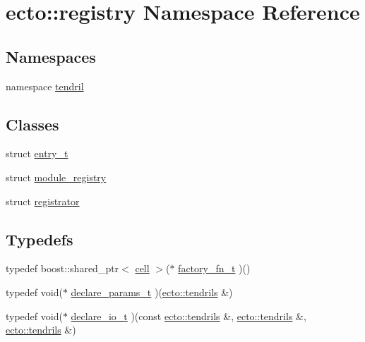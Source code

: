 \hypertarget{namespaceecto_1_1registry}{\section{ecto\-:\-:registry \-Namespace \-Reference}
\label{namespaceecto_1_1registry}
}
\subsection*{\-Namespaces}
\begin{DoxyCompactItemize}
\item 
namespace \hyperlink{namespaceecto_1_1registry_1_1tendril}{tendril}
\end{DoxyCompactItemize}
\subsection*{\-Classes}
\begin{DoxyCompactItemize}
\item 
struct \hyperlink{structecto_1_1registry_1_1entry__t}{entry\-\_\-t}
\item 
struct \hyperlink{structecto_1_1registry_1_1module__registry}{module\-\_\-registry}
\item 
struct \hyperlink{structecto_1_1registry_1_1registrator}{registrator}
\end{DoxyCompactItemize}
\subsection*{\-Typedefs}
\begin{DoxyCompactItemize}
\item 
typedef boost\-::shared\-\_\-ptr$<$ \hyperlink{structecto_1_1cell}{cell} $>$($\ast$ \hyperlink{namespaceecto_1_1registry_a3f75a16f135bcadb9bf1a7000b807b3b}{factory\-\_\-fn\-\_\-t} )()
\item 
typedef void($\ast$ \hyperlink{namespaceecto_1_1registry_a04d849b45313a8ce9a602095e1edade9}{declare\-\_\-params\-\_\-t} )(\hyperlink{classecto_1_1tendrils}{ecto\-::tendrils} \&)
\item 
typedef void($\ast$ \hyperlink{namespaceecto_1_1registry_af52d8f0fff3baaf352e2523ab8ed7977}{declare\-\_\-io\-\_\-t} )(const \hyperlink{classecto_1_1tendrils}{ecto\-::tendrils} \&, \hyperlink{classecto_1_1tendrils}{ecto\-::tendrils} \&, \hyperlink{classecto_1_1tendrils}{ecto\-::tendrils} \&)
\end{DoxyCompactItemize}
